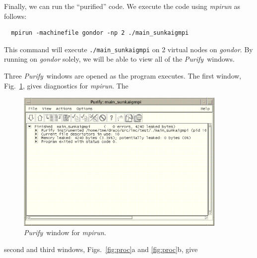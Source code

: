 \documentclass[11pt]{../tex/nmemo}
\newcommand{\purify}{\textsl{Purify}}
\newcommand{\dir}[1]{\textsl{#1}}
\begin{document}
Finally, we can run the ``purified'' code.  We execute the code using
\dir{mpirun} as follows:
\begin{verbatim}
  mpirun -machinefile gondor -np 2 ./main_sunkaigmpi
\end{verbatim}
This command will execute {\tt ./main\_sunkaigmpi} on 2 virtual nodes on
\dir{gondor}.  By running on \dir{gondor} solely, we will be able to
view all of the \purify\ windows.

Three \purify\ windows are opened as the program executes.  The first
window, Fig.~\ref{fig:main}, gives diagnostics for \dir{mpirun}.  The
\begin{figure}
  \centerline{\includegraphics[width=4in]{main.eps}}
  \caption{\purify\ window for \dir{mpirun}.}
  \label{fig:main}
\end{figure}
second and third windows, Figs.~\ref{fig:proc}a and \ref{fig:proc}b, give
\end{document}
